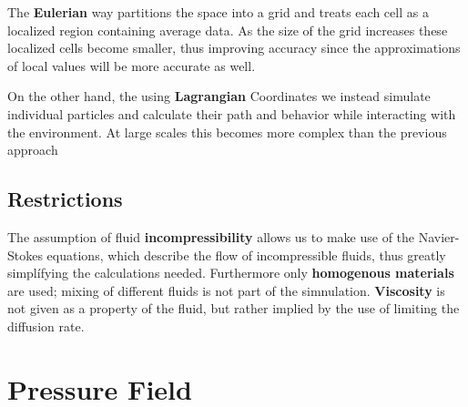 \documentclass[15pt, titlepage]{article}
\begin{document}
\begin{figure}[b]
\centering
\begin{minipage}{.5\textwidth}
  \centering
  \label{fig:test1}
\end{minipage}%
\begin{minipage}{.5\textwidth}
  \centering
  \label{fig:test2}
\end{minipage}
\end{figure}


The \textbf{Eulerian} way partitions the space into a grid and treats each cell as a localized region containing average data. As the size of the grid increases these localized cells become smaller, thus improving accuracy since the approximations of local values will be more accurate as well.

On the other hand, the using \textbf{Lagrangian} Coordinates we instead simulate individual particles and calculate their path and behavior while interacting with the environment.
At large scales this becomes more complex than the previous approach

\subsection{Restrictions}
The assumption of fluid \textbf{incompressibility} allows us to make use of the Navier-Stokes equations, which describe the flow of incompressible fluids, thus greatly simplífying the calculations needed.
Furthermore only \textbf{homogenous materials} are used; mixing of different fluids is not part of the simnulation.
\textbf{Viscosity} is not given as a property of the fluid, but rather implied by the use of limiting the diffusion rate.


\section{Pressure Field}
\end{document}
